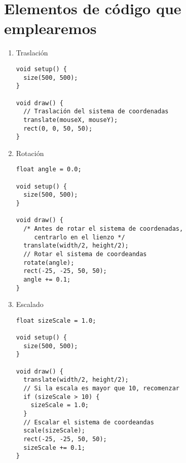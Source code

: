 \documentclass[a4paper,oneside]{article}
\begin{document}
\section{Elementos de código que emplearemos}
\begin{enumerate}
  \item Traslación

    \begin{verbatim}
void setup() {
  size(500, 500);
}

void draw() {
  // Traslación del sistema de coordenadas
  translate(mouseX, mouseY);
  rect(0, 0, 50, 50);
}
    \end{verbatim}

  \item Rotación

    \begin{verbatim}
float angle = 0.0;

void setup() {
  size(500, 500);
}

void draw() {
  /* Antes de rotar el sistema de coordenadas,
     centrarlo en el lienzo */ 
  translate(width/2, height/2);
  // Rotar el sistema de coordeandas
  rotate(angle);
  rect(-25, -25, 50, 50);
  angle += 0.1;
}
    \end{verbatim}

  \item Escalado

    \begin{verbatim}
float sizeScale = 1.0;

void setup() {
  size(500, 500);
}

void draw() {
  translate(width/2, height/2);
  // Si la escala es mayor que 10, recomenzar
  if (sizeScale > 10) {
    sizeScale = 1.0;
  }
  // Escalar el sistema de coordeandas 
  scale(sizeScale);
  rect(-25, -25, 50, 50);
  sizeScale += 0.1;
}
    \end{verbatim}

\end{enumerate}
\end{document}
